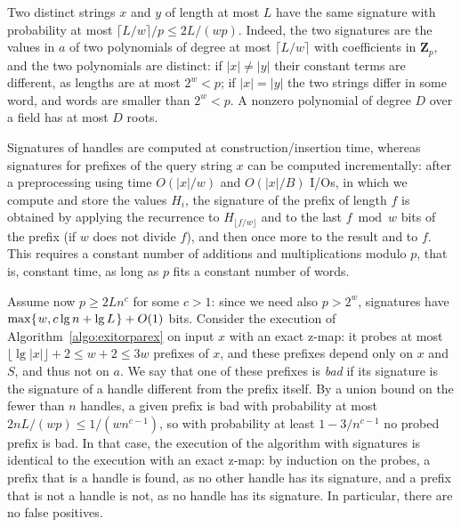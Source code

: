 \documentclass[a4paper]{article}
\newcommand{\?}{\mskip1.5mu}
\begin{document}
Two distinct strings $x$ and $y$ of length at most $L$ have the same signature with probability at most $\lceil L/w\rceil/p\leq 2L/(wp)$. Indeed,
the two signatures are the values in $a$ of two polynomials of degree at most $\lceil L/w\rceil$ with coefficients in $\mathbf Z_p$, and
the two polynomials are distinct: if $|x|\neq|y|$ their constant terms are different, as lengths are at most $2^w<p$; if $|x|=|y|$ the
two strings differ in some word, and words are smaller than $2^w<p$. A nonzero polynomial of degree $D$ over a field has at most $D$ roots.

Signatures of handles are computed at construction/insertion time,
whereas signatures for prefixes of the query string $x$ can be computed incrementally: after a
preprocessing using time $O(|x|/w)$ and $O(|x|/B)$ I/Os, in which we compute and store the values $H_i$, the signature of the
prefix of length $f$ is obtained by applying the recurrence to $H_{\lfloor f/w\rfloor}$ and to the last $f\bmod w$ bits of the prefix
(if $w$ does not divide $f$), and then once more to the result and to $f$. This requires a constant number of additions and multiplications
modulo $p$, that is, constant time, as long as $p$ fits a constant number of words.

Assume now $p\geq 2Ln^c$ for some $c>1$: since we need also $p>2^w$, signatures have $\max\{\?w, c\lg n + \lg L\?\}+O(1)$ bits.
Consider the execution of Algorithm~\ref{algo:exitorparex} on input $x$ with an exact z-map: it probes at most
$\lfloor\lg|x|\rfloor+2\leq w+2\leq 3w$ prefixes of $x$, and these prefixes depend only on $x$ and $S$, and thus not on $a$.
We say that one of these prefixes is \emph{bad} if its signature is the signature of a handle different from the prefix itself.
By a union bound on the fewer than $n$ handles, a given prefix is bad with probability at most $2nL/(wp)\leq 1/(wn^{c-1})$, so
with probability at least $1-3/n^{c-1}$ no probed prefix is bad. In that case, the execution of the algorithm with signatures
is identical to the execution with an exact z-map: by induction on the probes, a prefix that is a handle is found, as no other handle
has its signature, and a prefix that is not a handle is not, as no handle has its signature. In particular, there are no false positives.
\end{document}

